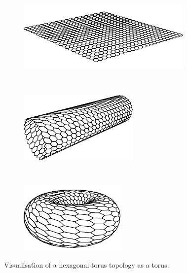 			\begin{figure}
				\center
				\begin{subfigure}{0.39\linewidth}
					\center
					\includegraphics[width=\linewidth]{figures/torus-3d-flat.pdf}
					\caption{}
					\label{fig:torus-3d-flat}
				\end{subfigure}
				~~
				\begin{subfigure}{0.26\linewidth}
					\center
					\includegraphics[width=\linewidth]{figures/torus-3d-tube.pdf}
					\caption{}
					\label{fig:torus-3d-tube}
				\end{subfigure}
				~~
				\begin{subfigure}{0.23\linewidth}
					\center
					\includegraphics[width=\linewidth]{figures/torus-3d-torus.pdf}
					\caption{}
					\label{fig:torus-3d-torus}
				\end{subfigure}
				
				\caption{Visualisation of a hexagonal torus topology as a torus.}
				\label{fig:torus-3d}
			\end{figure}
			
